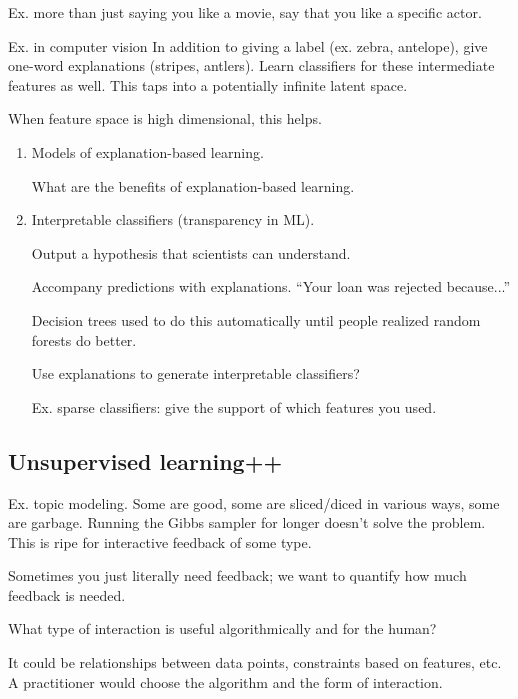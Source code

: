 Ex. more than just saying you like a movie, say that you like a specific actor.

Ex. in computer vision %
In addition to giving a label (ex. zebra, antelope), give one-word explanations (stripes, antlers). Learn classifiers for these intermediate features as well. This taps into a potentially infinite latent space.

When feature space is high dimensional, this helps.

\begin{enumerate}
\item
Models of explanation-based learning.

What are the benefits of explanation-based learning.
\item
Interpretable classifiers (transparency in ML).

Output a hypothesis that scientists can understand.

Accompany predictions with explanations. ``Your loan was rejected because...''

Decision trees used to do this automatically until people realized random forests do better.

Use explanations to generate interpretable classifiers?

Ex. sparse classifiers: give the support of which features you used.
\end{enumerate}
\subsection{Unsupervised learning++}

Ex. topic modeling. Some are good, some are sliced/diced in various ways, some are garbage. Running the Gibbs sampler for longer doesn't solve the problem. This is ripe for interactive feedback of some type.

Sometimes you just literally need feedback; we want to quantify how much feedback is needed.

What type of interaction is useful algorithmically and for the human?

It could be relationships between data points, constraints based on features, etc. A practitioner would choose the algorithm and the form of interaction. %

